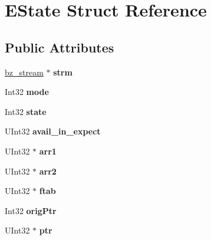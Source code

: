 \hypertarget{structEState}{\section{E\-State Struct Reference}
\label{structEState}
}
\subsection*{Public Attributes}
\begin{DoxyCompactItemize}
\item 
\hypertarget{structEState_a7063b24558691ab4405a034558ca0780}{\hyperlink{structbz__stream}{bz\-\_\-stream} $\ast$ {\bfseries strm}}\label{structEState_a7063b24558691ab4405a034558ca0780}

\item 
\hypertarget{structEState_aa8bcff8ad3c08aa1d4104f3a1f98675e}{Int32 {\bfseries mode}}\label{structEState_aa8bcff8ad3c08aa1d4104f3a1f98675e}

\item 
\hypertarget{structEState_a103955affd2678bb4be0b7d272cea6d8}{Int32 {\bfseries state}}\label{structEState_a103955affd2678bb4be0b7d272cea6d8}

\item 
\hypertarget{structEState_a2c253cc7ac4cb5906bfa27a95f9d8f40}{U\-Int32 {\bfseries avail\-\_\-in\-\_\-expect}}\label{structEState_a2c253cc7ac4cb5906bfa27a95f9d8f40}

\item 
\hypertarget{structEState_a913260bad0cf37079a08b9a133293aaa}{U\-Int32 $\ast$ {\bfseries arr1}}\label{structEState_a913260bad0cf37079a08b9a133293aaa}

\item 
\hypertarget{structEState_ae482d96bff0988edaf4422eef4a7050c}{U\-Int32 $\ast$ {\bfseries arr2}}\label{structEState_ae482d96bff0988edaf4422eef4a7050c}

\item 
\hypertarget{structEState_a28875568269ede0a2e40d6ec21636113}{U\-Int32 $\ast$ {\bfseries ftab}}\label{structEState_a28875568269ede0a2e40d6ec21636113}

\item 
\hypertarget{structEState_ae5f37ef91f4b3a4165f99a7444eeae6f}{Int32 {\bfseries orig\-Ptr}}\label{structEState_ae5f37ef91f4b3a4165f99a7444eeae6f}

\item 
\hypertarget{structEState_a6d014c56a52f7f0a4c680ddbae266577}{U\-Int32 $\ast$ {\bfseries ptr}}\label{structEState_a6d014c56a52f7f0a4c680ddbae266577}


\end{DoxyCompactItemize}
